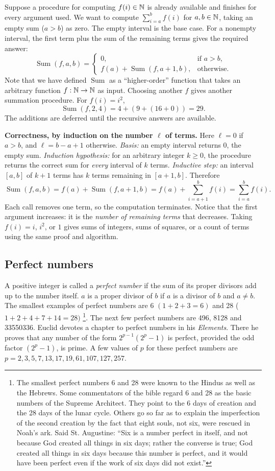 Suppose a procedure for computing $f(i)\in\mathbb{N}$ is already available and
finishes for every argument used. We want to compute
$\sum_{i=a}^{b}f(i)$ for $a,b\in\mathbb{N}$, taking an empty sum ($a>b$) as zero.
The empty interval is the base case. For a nonempty interval, the first term
plus the sum of the remaining terms gives the required answer:
\[
\operatorname{Sum}(f,a,b)=\begin{cases}
0,&\text{if }a>b,\\
f(a)+\operatorname{Sum}(f,a+1,b),&\text{otherwise}.
\end{cases}
\]
Note that we have defined $\operatorname{Sum}$ as a ``higher-order'' function that takes an arbitrary function $f: \mathbb{N} \rightarrow \mathbb{N}$ as input.
Choosing another $f$ gives another summation procedure. For $f(i)=i^2$,
\[
\operatorname{Sum}(f,2,4)=4+(9+(16+0))=29.
\]
The additions are deferred until the recursive answers are available.

\textbf{Correctness, by induction on the number $\ell$ of terms.}
Here $\ell=0$ if $a>b$, and $\ell=b-a+1$ otherwise.
\emph{Basis:} an empty interval returns $0$, the empty sum.
\emph{Induction hypothesis:} for an arbitrary integer $k\geq0$, the
procedure returns the correct sum for \emph{every} interval of $k$ terms.
\emph{Inductive step:} an interval $[a,b]$ of $k+1$ terms has $k$ terms
remaining in $[a+1,b]$. Therefore
\[
\operatorname{Sum}(f,a,b)
=f(a)+\operatorname{Sum}(f,a+1,b)
=f(a)+\sum_{i=a+1}^{b}f(i)=\sum_{i=a}^{b}f(i).
\]
Each call removes one term, so the computation terminates. Notice that the
first argument increases: it is the \emph{number of remaining terms} that
decreases. Taking $f(i)=i$, $i^2$, or $1$ gives sums of integers, sums of
squares, or a count of terms using the same proof and algorithm.

\subsection{Perfect numbers}
A positive integer is called a {\em perfect number} if the sum of its 
proper divisors add up to the number itself. 
$a$ is a proper divisor of $b$ if $a$ is a divisor of $b$ and $ a \neq b$.
The smallest examples of perfect numbers
are 6 $(1 + 2 + 3 = 6)$ and 28 ($1 + 2 + 4 + 7 + 14 = 28)$ \footnote{
The smallest perfect numbers 6 and 28 were known to the Hindus as well
as the Hebrews. Some commentators of the bible  regard 6 and 28 as the basic
numbers of the Supreme Architect. They point to the 6 days of creation and
the 28 days of the lunar cycle. Others go so far as to explain the
imperfection of the second creation  by the fact that eight souls, not six,
were rescued in Noah's ark. Said St. Augustine: ``Six is a number perfect
in itself, and not because God created all things in six days; rather the
converse is true; God created all things in six days because this number is perfect,
and it would have been perfect even if the work of six days did not exist.''}. 
The next few perfect numbers are 496, 8128 and 33550336. Euclid devotes
a chapter to perfect numbers in his {\em Elements}. There he proves that
any number of the form $2^{p-1}(2^p - 1)$ is perfect, provided the
odd factor $(2^p - 1)$, is prime. A few values of $p$ for these perfect numbers 
are $p = 2,3,5,7,13,17,19,61,107,127,257$.

